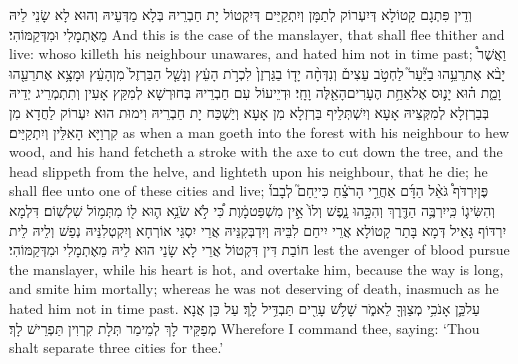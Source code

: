 {וְדֵין פִּתְגָם קָטוֹלָא דְּיִעְרוֹק לְתַמָּן וְיִתְקַיַּים דְּיִקְטוֹל יָת חַבְרֵיהּ בְּלָא מַדְּעֵיהּ וְהוּא לָא שָׂנֵי לֵיהּ מֵאֶתְמָלִי וּמִדְּקַמּוֹהִי׃}
{And this is the case of the manslayer, that shall flee thither and live: whoso killeth his neighbour unawares, and hated him not in time past;}{}
{וַאֲשֶׁר֩ יָבֹ֨א אֶת\maqqaf רֵעֵ֥הוּ בַיַּ֘עַר֮ לַחְטֹ֣ב עֵצִים֒ וְנִדְּחָ֨ה יָד֤וֹ בַגַּרְזֶן֙ לִכְרֹ֣ת הָעֵ֔ץ וְנָשַׁ֤ל הַבַּרְזֶל֙ מִן\maqqaf הָעֵ֔ץ וּמָצָ֥א אֶת\maqqaf רֵעֵ֖הוּ וָמֵ֑ת ה֗וּא יָנ֛וּס אֶל\maqqaf אַחַ֥ת הֶעָרִים\maqqaf הָאֵ֖לֶּה וָחָֽי׃}
{וּדְיֵיעוֹל עִם חַבְרֵיהּ בְּחוּרְשָׁא לְמִקַּץ אָעִין וְתִתְמְרֵיג יְדֵיהּ בְּבַרְזְלָא לְמִקְּצֵיהּ אָעָא וְיִשְׁתְּלֵיף בַּרְזְלָא מִן אָעָא וְיַשְׁכַּח יָת חַבְרֵיהּ וִימוּת הוּא יִעְרוֹק לַחֲדָא מִן קִרְוַיָּא הָאִלֵּין וְיִתְקַיַּים׃}
{as when a man goeth into the forest with his neighbour to hew wood, and his hand fetcheth a stroke with the axe to cut down the tree, and the head slippeth from the helve, and lighteth upon his neighbour, that he die; he shall flee unto one of these cities and live;}{}
{פֶּן\maqqaf יִרְדֹּף֩ גֹּאֵ֨ל הַדָּ֜ם אַחֲרֵ֣י הָרֹצֵ֗חַ כִּי\maqqaf יֵחַם֮ לְבָבוֹ֒ וְהִשִּׂיג֛וֹ כִּֽי\maqqaf יִרְבֶּ֥ה הַדֶּ֖רֶךְ וְהִכָּ֣הוּ נָ֑פֶשׁ וְלוֹ֙ אֵ֣ין מִשְׁפַּט\maqqaf מָ֔וֶת כִּ֠י לֹ֣א שֹׂנֵ֥א ה֛וּא ל֖וֹ מִתְּמ֥וֹל שִׁלְשֽׁוֹם׃}
{דִּלְמָא יִרְדּוֹף גָּאֵיל דְּמָא בָּתַר קָטוֹלָא אֲרֵי יִיחַם לִבֵּיהּ וְיִדְבְּקִנֵּיהּ אֲרֵי יִסְגֵּי אוֹרְחָא וְיִקְטְלִנֵּיהּ נְפַשׁ וְלֵיהּ לֵית חוֹבַת דִּין דִּקְטוֹל אֲרֵי לָא שָׂנֵי הוּא לֵיהּ מֵאֶתְמָלִי וּמִדְּקַמּוֹהִי׃}
{lest the avenger of blood pursue the manslayer, while his heart is hot, and overtake him, because the way is long, and smite him mortally; whereas he was not deserving of death, inasmuch as he hated him not in time past.}{}
{עַל\maqqaf כֵּ֛ן אָנֹכִ֥י מְצַוְּךָ֖ לֵאמֹ֑ר שָׁלֹ֥שׁ עָרִ֖ים תַּבְדִּ֥יל לָֽךְ׃}
{עַל כֵּן אֲנָא מְפַקֵּיד לָךְ לְמֵימַר תְּלָת קִרְוִין תַּפְרֵישׁ לָךְ׃}
{Wherefore I command thee, saying: ‘Thou shalt separate three cities for thee.’}{}
